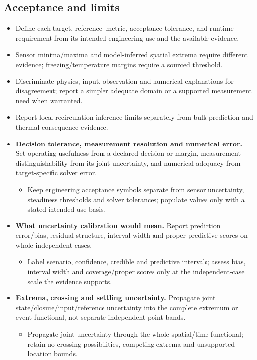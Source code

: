\subsection{Acceptance and limits}\label{subsec:acceptance-and-limits}
\begin{itemize}[leftmargin=*]
\item Define each target, reference, metric, acceptance tolerance, and runtime requirement from its intended engineering use and the available evidence.
\item Sensor minima/\allowbreak{}maxima and model-inferred spatial extrema require different evidence; freezing/\allowbreak{}temperature margins require a sourced threshold.
\item Discriminate physics, input, observation and numerical explanations for disagreement; report a simpler adequate domain or a supported measurement need when warranted.
\item Report local recirculation inference limits separately from bulk prediction and thermal-consequence evidence.

\item {}\textbf{Decision tolerance, measurement resolution and numerical error.} Set operating usefulness from a declared decision or margin, measurement distinguishability from its joint uncertainty, and numerical adequacy from target-specific solver error.
\begin{itemize}
\item Keep engineering acceptance symbols separate from sensor uncertainty, steadiness thresholds and solver tolerances; populate values only with a stated intended-use basis.
\end{itemize}
\item {}\textbf{What uncertainty calibration would mean.} Report prediction error/\allowbreak{}bias, residual structure, interval width and proper predictive scores on whole independent cases.\cite{oliver2014unobserved}
\begin{itemize}
\item Label scenario, confidence, credible and predictive intervals; assess bias, interval width and coverage/\allowbreak{}proper scores only at the independent-case scale the evidence supports.
\end{itemize}
\item {}\textbf{Extrema, crossing and settling uncertainty.} Propagate joint state/\allowbreak{}closure/\allowbreak{}input/\allowbreak{}reference uncertainty into the complete extremum or event functional, not separate independent point bands.
\begin{itemize}
\item Propagate joint uncertainty through the whole spatial/\allowbreak{}time functional; retain no-crossing possibilities, competing extrema and unsupported-location bounds.
\end{itemize}
\end{itemize}

